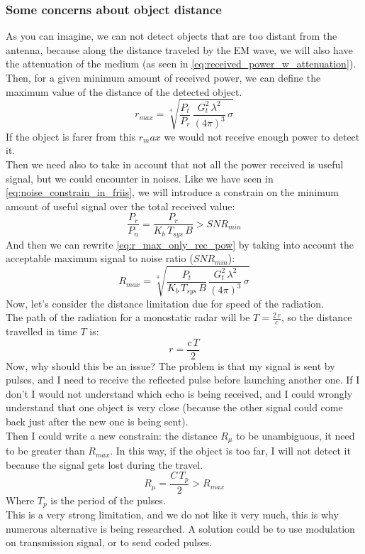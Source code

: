 \subsubsection*{Some concerns about object distance}
As you can imagine, we can not detect objects that are too distant from the antenna, because along the distance traveled by the EM wave, we will also have the attenuation of the medium (as seen in \cref{eq:received_power_w_attenuation}).\\
Then, for a given minimum amount of received power, we can define the maximum value of the distance of the detected object. 
\begin{equation}\label{eq:r_max_only_rec_pow}
    r_{max}=\sqrt[4]{\frac{P_t}{P_r}\,\frac{G_t^2\,\lambda^2}{(4\pi)^3}\,\sigma}
\end{equation}
If the object is farer from this $r_max$ we would not receive enough power to detect it.\\
Then we need also to take in account that not all the power received is useful signal, but we could encounter in noises. Like we have seen in \cref{eq:noise_constrain_in_friis}, we will introduce a constrain on the minimum amount of useful signal over the total received value:
\begin{equation}
    \frac{P_r}{P_n}=\frac{P_r}{K_b\,T_{sys}\,B}>SNR_{min}
\end{equation}
And then we can rewrite \cref{eq:r_max_only_rec_pow} by taking into account the acceptable maximum signal to noise ratio ($SNR_{min}$):
\begin{equation}
    R_{max}=\sqrt[4]{\frac{P_t}{K_b\,T_{sys}\,B}\,\frac{G_t^2\,\lambda^2}{(4\pi)^3}\,\sigma}
\end{equation}
Now, let's consider the distance limitation due for speed of the radiation.\\
The path of the radiation for a monostatic radar will be $T=\frac{2\,r}{c}$, so the distance travelled in time $T$ is:
\begin{equation}
    r=\frac{c\,T}{2}
\end{equation}
Now, why should this be an issue? The problem is that my signal is sent by pulses, and I need to receive the reflected pulse before launching another one. If I don't I would not understand which echo is being received, and I could wrongly understand that one object is very close (because the other signal could come back just after the new one is being sent).\\
Then I could write a new constrain: the distance $R_\mu$ to be unambiguous, it need to be greater than $R_{max}$. In this way, if the object is too far, I will not detect it because the signal gets lost during the travel.
\begin{equation}
    R_\mu=\frac{C\,T_p}{2}>R_{max}
\end{equation}
Where $T_p$ is the period of the pulses.\\
This is a very strong limitation, and we do not like it very much, this is why numerous alternative is being researched. A solution could be to use modulation on transmission signal, or to send coded pulses.
